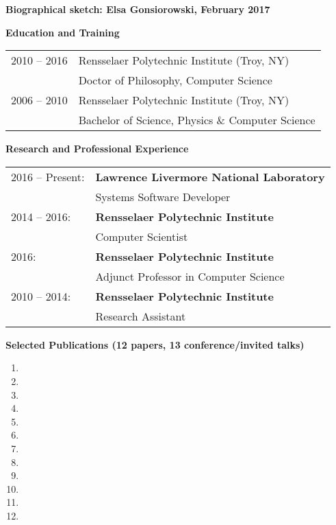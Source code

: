 \documentclass[times,11pt]{article}    %
\begin{document}
\begin{center}
\textbf{\sffamily\large Biographical sketch: Elsa Gonsiorowski, February 2017}
\end{center}

\vskip 3pt
\textbf{\sffamily Education and Training}
\vskip 3pt

\begin{tabular}{ll}
\\
2010 -- 2016 & Rensselaer Polytechnic Institute (Troy, NY)\\
             & Doctor of Philosophy, Computer Science\\
2006 -- 2010 & Rensselaer Polytechnic Institute (Troy, NY)\\
             & Bachelor of Science, Physics \& Computer Science\\
\end{tabular}

\vskip 3pt
\textbf{\sffamily Research and Professional Experience}
\vskip 3pt

\begin{tabular}{ll}
2016 -- Present: & 
\textbf{Lawrence Livermore National Laboratory}\\
 & Systems Software Developer \\

2014 -- 2016: &
\textbf{Rensselaer Polytechnic Institute}\\
 & Computer Scientist \\

2016: & 
\textbf{Rensselaer Polytechnic Institute}\\
 & Adjunct Professor in Computer Science \\

2010 -- 2014: & 
\textbf{Rensselaer Polytechnic Institute}\\
 & Research Assistant \\
\end{tabular}

\vskip 3pt
\textbf{\sffamily Selected Publications (12 papers, 13 conference/invited talks)}

\begin{enumerate}
\item {}
\item {}
\item {}
\item {}
\item {}
\item {}
\item {}
\item {}
\item {}
\item {}
\item {}
\item {}
\end{enumerate}
\end{document}
